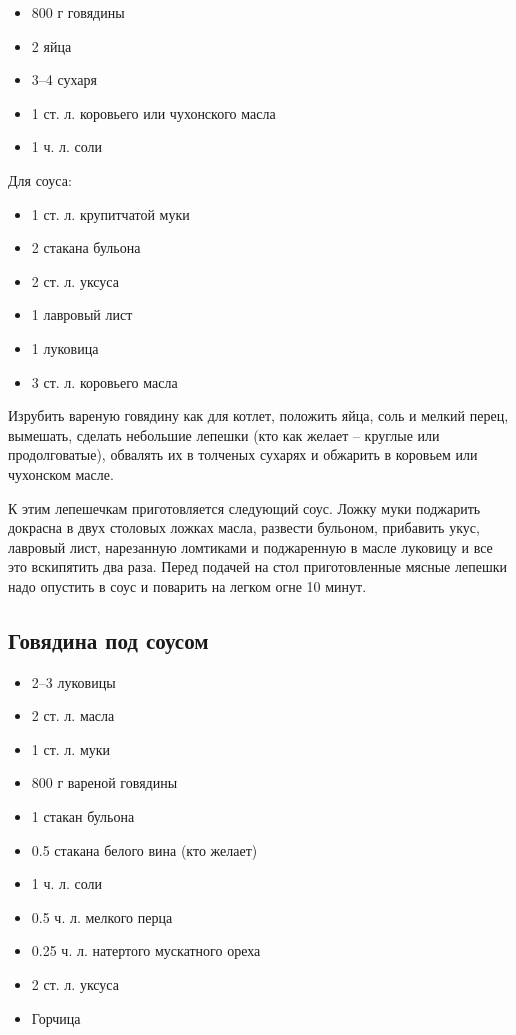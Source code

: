 \begin{itemize}
	\item 800 г говядины 
    \item 2 яйца 
    \item 3–4 сухаря 
    \item 1 ст. л. коровьего или чухонского масла 
    \item 1 ч. л. соли
\end{itemize}

Для соуса: 

\begin{itemize}
	\item 1 ст. л. крупитчатой муки 
    \item 2 стакана бульона 
    \item 2 ст. л. уксуса 
    \item 1 лавровый лист 
    \item 1 луковица 
    \item 3 ст. л. коровьего масла
\end{itemize}

Изрубить вареную говядину как для котлет, положить яйца, соль и мелкий перец, вымешать, сделать небольшие лепешки (кто как желает – круглые или продолговатые), обвалять их в толченых сухарях и обжарить в коровьем или чухонском масле.

К этим лепешечкам приготовляется следующий соус. Ложку муки поджарить докрасна в двух столовых ложках масла, развести бульоном, прибавить укус, лавровый лист, нарезанную ломтиками и поджаренную в масле луковицу и все это вскипятить два раза. Перед подачей на стол приготовленные мясные лепешки надо опустить в соус и поварить на легком огне 10 минут.

\subsection{Говядина под соусом}

\begin{itemize}
	\item 2–3 луковицы 
    \item 2 ст. л. масла 
    \item 1 ст. л. муки 
    \item 800 г вареной говядины 
    \item 1 стакан бульона 
    \item 0.5 стакана белого вина (кто желает) 
    \item 1 ч. л. соли 
    \item 0.5 ч. л. мелкого перца 
    \item 0.25 ч. л. натертого мускатного ореха 
    \item 2 ст. л. уксуса 
    \item Горчица
\end{itemize}

